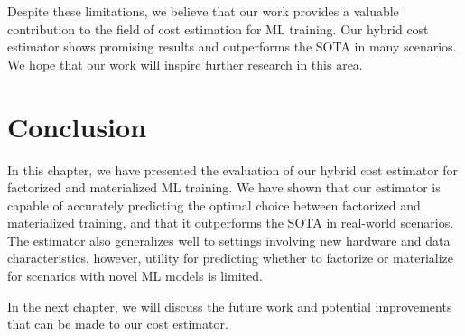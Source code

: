 Despite these limitations, we believe that our work provides a valuable contribution to the field of cost estimation for ML training. Our hybrid cost estimator shows promising results and outperforms the SOTA in many scenarios. We hope that our work will inspire further research in this area.

\section{Conclusion}
\label{sec:eval-conclusion}

In this chapter, we have presented the evaluation of our hybrid cost estimator for factorized and materialized ML training. We have shown that our estimator is capable of accurately predicting the optimal choice between factorized and materialized training, and that it outperforms the SOTA in real-world scenarios. The estimator also generalizes well to settings involving new hardware and data characteristics, however, utility for predicting whether to factorize or materialize for scenarios with novel ML models is limited.

In the next chapter, we will discuss the future work and potential improvements that can be made to our cost estimator.
